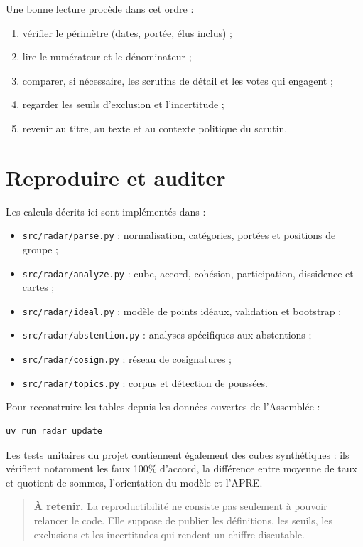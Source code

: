 \documentclass[11pt,a4paper]{article}
\newcommand{\code}[1]{\texttt{#1}}
\newcommand{\important}[1]{\begin{quote}\small\color{blue!55!black}\textbf{À retenir.} #1\end{quote}}
\begin{document}
Une bonne lecture procède dans cet ordre :

\begin{enumerate}
  \item vérifier le périmètre (dates, portée, élus inclus) ;
  \item lire le numérateur et le dénominateur ;
  \item comparer, si nécessaire, les scrutins de détail et les votes qui engagent ;
  \item regarder les seuils d'exclusion et l'incertitude ;
  \item revenir au titre, au texte et au contexte politique du scrutin.
\end{enumerate}

\section{Reproduire et auditer}

Les calculs décrits ici sont implémentés dans :

\begin{itemize}
  \item \code{src/radar/parse.py} : normalisation, catégories, portées et
  positions de groupe ;
  \item \code{src/radar/analyze.py} : cube, accord, cohésion, participation,
  dissidence et cartes ;
  \item \code{src/radar/ideal.py} : modèle de points idéaux, validation et
  bootstrap ;
  \item \code{src/radar/abstention.py} : analyses spécifiques aux abstentions ;
  \item \code{src/radar/cosign.py} : réseau de cosignatures ;
  \item \code{src/radar/topics.py} : corpus et détection de poussées.
\end{itemize}

Pour reconstruire les tables depuis les données ouvertes de l'Assemblée :

\begin{verbatim}
uv run radar update
\end{verbatim}

Les tests unitaires du projet contiennent également des cubes synthétiques :
ils vérifient notamment les faux 100\% d'accord, la différence entre moyenne de
taux et quotient de sommes, l'orientation du modèle et l'APRE.

\important{La reproductibilité ne consiste pas seulement à pouvoir relancer le
code. Elle suppose de publier les définitions, les seuils, les exclusions et
les incertitudes qui rendent un chiffre discutable.}
\end{document}
